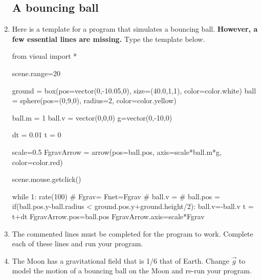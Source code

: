 \begin{enumerate}

\subsection*{A bouncing ball}

\item Here is a template for a program that simulates a bouncing ball. {\bf However, a few essential lines are missing.} Type the template below.

\begin{vpythonblock}
from visual import *

scene.range=20

ground = box(pos=vector(0,-10.05,0), size=(40.0,1,1), color=color.white)
ball = sphere(pos=(0,9,0), radius=2, color=color.yellow)

ball.m = 1
ball.v = vector(0,0,0)
g=vector(0,-10,0)

dt = 0.01
t = 0

scale=0.5
FgravArrow = arrow(pos=ball.pos, axis=scale*ball.m*g, color=color.red)

scene.mouse.getclick()

while 1:
        rate(100)
#        Fgrav=
        Fnet=Fgrav
#        ball.v = 
#        ball.pos = 
        if(ball.pos.y-ball.radius < ground.pos.y+ground.height/2):
                ball.v=-ball.v
        t = t+dt
        FgravArrow.pos=ball.pos
        FgravArrow.axis=scale*Fgrav
\end{vpythonblock}



\item The commented lines must be completed for the program to work. Complete each of these lines and run your program.



\item The Moon has a gravitational field that is 1/6 that of Earth. Change $\vec{g}$ to model the motion of a bouncing ball on the Moon and re-run your program.


\end{enumerate}

